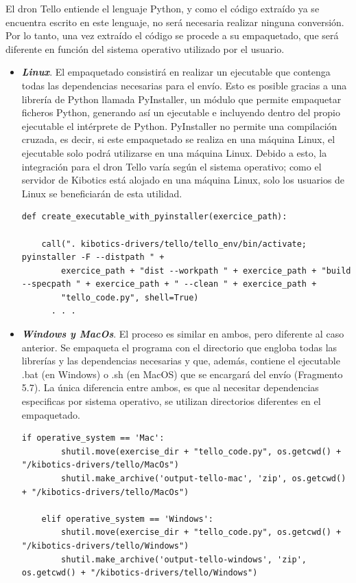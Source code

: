 \documentclass{report}
\begin{document}
El dron Tello entiende el lenguaje Python, y como el código extraído ya se encuentra escrito en este lenguaje, no será necesaria realizar ninguna conversión. Por lo tanto, una vez extraído el código se procede a su empaquetado, que será diferente en función del sistema operativo utilizado por el usuario.
\\
\begin{itemize}
	\item \textit{\textbf{Linux}}. El empaquetado consistirá en realizar un ejecutable que contenga todas las dependencias necesarias para el envío. Esto es posible gracias a una librería de Python llamada PyInstaller, un módulo que permite empaquetar ficheros Python, generando así un ejecutable e incluyendo dentro del propio ejecutable el intérprete de Python. PyInstaller no permite una compilación cruzada, es decir, si este empaquetado se realiza en una máquina Linux, el ejecutable solo podrá utilizarse en una máquina Linux. Debido a esto, la integración para el dron Tello varía según el sistema operativo; como el servidor de Kibotics está alojado en una máquina Linux, solo los usuarios de Linux se beneficiarán de esta utilidad.
\begin{lstlisting}[frame=single,breaklines=true, label=Creación ejecutable con PyInstaller, caption=Creación ejecutable con PyInstaller,  captionpos=b]
   def create_executable_with_pyinstaller(exercice_path):
    		      
   	call(". kibotics-drivers/tello/tello_env/bin/activate; pyinstaller -F --distpath " +
      	exercice_path + "dist --workpath " + exercice_path + "build --specpath " + exercice_path + " --clean " + exercice_path +
      	"tello_code.py", shell=True)
      . . . 
\end{lstlisting}
	
	
	\item \textit{\textbf{Windows y MacOs}}. El proceso es similar en ambos, pero diferente al caso anterior. Se empaqueta el programa con el directorio que engloba todas las librerías y las dependencias necesarias y que, además, contiene el ejecutable .bat (en Windows) o .sh (en MacOS) que se encargará del envío (Fragmento 5.7). La única diferencia entre ambos, es que al necesitar dependencias especificas por sistema operativo, se utilizan directorios diferentes en el empaquetado.
	\\
\begin{lstlisting}[frame=single,breaklines=true, label=Creación empaquetado en Windows y MacOs, caption=Creación empaquetado y respuesta en Windows y MacOs,  captionpos=b]
   if operative_system == 'Mac':
        shutil.move(exercise_dir + "tello_code.py", os.getcwd() + "/kibotics-drivers/tello/MacOs")
        shutil.make_archive('output-tello-mac', 'zip', os.getcwd() + "/kibotics-drivers/tello/MacOs")

    elif operative_system == 'Windows':
        shutil.move(exercise_dir + "tello_code.py", os.getcwd() + "/kibotics-drivers/tello/Windows")
        shutil.make_archive('output-tello-windows', 'zip', os.getcwd() + "/kibotics-drivers/tello/Windows")

\end{lstlisting}	

\end{itemize}
\end{document}
